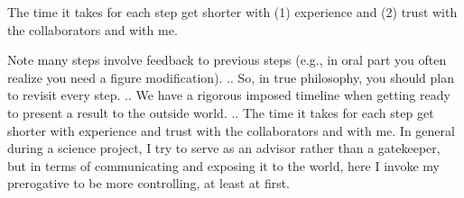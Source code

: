 \documentclass[letterpaper,10pt,english]{sphinxmanual}
\begin{document}
\sphinxAtStartPar
The time it takes for each step get shorter with (1) experience and (2) trust with the collaborators and with me.

\sphinxAtStartPar
Note many steps involve feedback to previous steps (e.g., in oral part you often realize you need a figure modification).
.. So, in true {\hyperref[\detokenize{03CodersAtWork:codersatwork}]{}} philosophy, you should plan to revisit every step.
.. We have a rigorous imposed timeline when getting ready to present a result to the outside world.
.. The time it takes for each step get shorter with experience and trust with the collaborators and with me.
In general during a science project, I try to serve as an advisor rather than a gatekeeper, but in terms of communicating and exposing it to the world, here I invoke my prerogative to be more controlling, at least at first.
\end{document}
